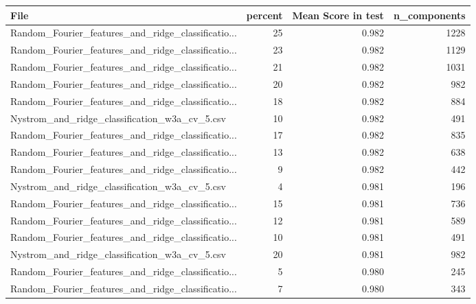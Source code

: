 \begin{tabularx}{\textwidth}{lrrr}
\toprule
                                              File &  percent &  Mean Score in test &  n\_components \\
\midrule
Random\_Fourier\_features\_and\_ridge\_classificatio... &       25 &               0.982 &          1228 \\
Random\_Fourier\_features\_and\_ridge\_classificatio... &       23 &               0.982 &          1129 \\
Random\_Fourier\_features\_and\_ridge\_classificatio... &       21 &               0.982 &          1031 \\
Random\_Fourier\_features\_and\_ridge\_classificatio... &       20 &               0.982 &           982 \\
Random\_Fourier\_features\_and\_ridge\_classificatio... &       18 &               0.982 &           884 \\
     Nystrom\_and\_ridge\_classification\_w3a\_cv\_5.csv &       10 &               0.982 &           491 \\
Random\_Fourier\_features\_and\_ridge\_classificatio... &       17 &               0.982 &           835 \\
Random\_Fourier\_features\_and\_ridge\_classificatio... &       13 &               0.982 &           638 \\
Random\_Fourier\_features\_and\_ridge\_classificatio... &        9 &               0.982 &           442 \\
     Nystrom\_and\_ridge\_classification\_w3a\_cv\_5.csv &        4 &               0.981 &           196 \\
Random\_Fourier\_features\_and\_ridge\_classificatio... &       15 &               0.981 &           736 \\
Random\_Fourier\_features\_and\_ridge\_classificatio... &       12 &               0.981 &           589 \\
Random\_Fourier\_features\_and\_ridge\_classificatio... &       10 &               0.981 &           491 \\
     Nystrom\_and\_ridge\_classification\_w3a\_cv\_5.csv &       20 &               0.981 &           982 \\
Random\_Fourier\_features\_and\_ridge\_classificatio... &        5 &               0.980 &           245 \\
Random\_Fourier\_features\_and\_ridge\_classificatio... &        7 &               0.980 &           343 \\

\end{tabularx}
